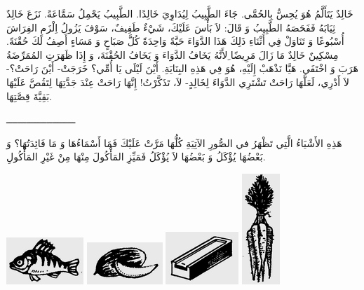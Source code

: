 \documentclass[a5paper]{article}
\begin{document}
خَالِدٌ يَتَأَلَّمُ هُوَ يُحِسُّ بِالحُمَّى. جَاءَ الطَّبِيبُ لِيُدَاوِيَ خَالِدًا. الطَّبِيبُ يَحْمِلُ سَمَّاعَةً. نَزَعَ خَالِدٌ ثِيَابَهُ فَفَحَصَهُ الطَّبِيبُ وَ قَالَ: لاَ بَأْسَ عَلَيْكَ، شَيْءٌ طَفِيفٌ، سَوْفَ يَزُولُ اِلْزَمِ الفِرَاشَ أُسْبُوعًا وَ تَنَاوَلْ فِي أَثْنَاءِ ذَلِكَ هَذَا الدَّوَاءَ حَبَّةً وَاحِدَةً كُلَّ صَبَاحٍ وَ مَسَاءٍ أَصِفُ لَكَ حُقْنَةً. مِسْكِينٌ خَالِدٌ مَا زَالَ مَرِيضًا ِلأَنَّهُ يَخَافُ الدَّوَاءَ وَ يَخَافُ الحُقْنَةَ، وَ إِذَا ظَهَرَتِ المُمَرِّضَةُ هَرَبَ وَ اخْتَفَى. هَيَّا نَذْهَبْ إِلَيْهِ، هُوَ فِي هَذِهِ البِنَايَةِ. أَيْنَ لَيْلَى يَا أُمِّي؟ خَرَجَتْ- أَيْنَ رَاحَتْ؟- لاَ أَدْرِي، لَعَلَّهَا رَاحَتْ تَشْتَرِي الدَّوَاءَ لِخَالِدٍ- لاَ، تَذَكَّرْتُ! إِنَّهَا رَاحَتْ عِنْدَ جَدَّتِهَا لِتَقُصَّ عَلَيْهَا بَقِيَّةَ قِصَّتِهَا.

ــــــــــــــــــــــــ

هَذِهِ الأَشْيَاءُ الَّتِي تَظْهَرُ في الصُّورِ الآتِيَةِ كُلُّهَا مَرَّتْ عَلَيْكَ فَمَا أَسْمَاءُهَا وَ مَا فَائِدَتُهَا؟ وَ بَعْضُهَا يُؤْكَلُ وَ بَعْضُهَا لاَ يُؤْكَلُ فَمَيِّزِ المَأْكُولَ مِنْهَا مِنْ غَيْرِ المَأْكُولِ.

 \includegraphics[width=1.1457in,height=0.698in]{images/MuhammadBagauddinprettified-img323.png}   \includegraphics[width=1.1252in,height=0.6252in]{images/MuhammadBagauddinprettified-img324.png}   \includegraphics[width=1.0835in,height=0.7811in]{images/MuhammadBagauddinprettified-img325.png}   \includegraphics[width=0.5626in,height=1.6457in]{images/MuhammadBagauddinprettified-img326.png} 
\end{document}
